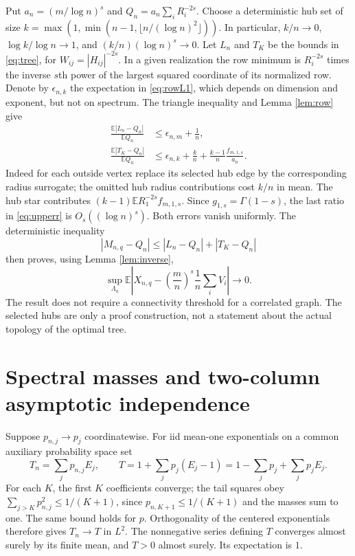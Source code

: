 \documentclass[11pt]{article}
\newcommand{\E}{\mathbb E}
\begin{document}
Put $a_n=(m/\log n)^s$ and $Q_n=a_n\sum_iR_i^{-2s}$. Choose a deterministic hub set of size $k=\max(1,\min(n-1,\lfloor n/(\log n)^2\rfloor))$. In particular, $k/n\to0$, $\log k/\log n\to1$, and $(k/n)(\log n)^s\to0$. Let $L_n$ and $T_K$ be the bounds in \eqref{eq:tree}, for $W_{ij}=|H_{ij}|^{-2s}$. In a given realization the row minimum is $R_i^{-2s}$ times the inverse $s$th power of the largest squared coordinate of its normalized row. Denote by $\epsilon_{n,k}$ the expectation in \eqref{eq:rowL1}, which depends on dimension and exponent, but not on spectrum. The triangle inequality and Lemma \ref{lem:row} give
\begin{align}
\frac{\E|L_n-Q_n|}{\E Q_n}&\le \epsilon_{n,m}+\frac1n,\label{eq:lowerr}\\
\frac{\E|T_K-Q_n|}{\E Q_n}&\le\epsilon_{n,k}+\frac{k}{n}+\frac{k-1}{n}\frac{f_{m,1,s}}{a_n}.\label{eq:upperr}
\end{align}
Indeed for each outside vertex replace its selected hub edge by the corresponding radius surrogate; the omitted hub radius contributions cost $k/n$ in mean. The hub star contributes $(k-1)\E R_1^{-2s} f_{m,1,s}$. Since $g_{1,s}=\Gamma(1-s)$, the last ratio in \eqref{eq:upperr} is $O_s((\log n)^s)$. Both errors vanish uniformly. The deterministic inequality
\[
|M_{n,q}-Q_n|\le |L_n-Q_n|+|T_K-Q_n|
\]
then proves, using Lemma \ref{lem:inverse},
\begin{equation}
\sup_{\Lambda_n}\E\left|X_{n,q}-\left(\frac{m}{n}\right)^s\frac1n\sum_i V_i\right|\to0.
\label{eq:surrogate}
\end{equation}
The result does not require a connectivity threshold for a correlated graph. The selected hubs are only a proof construction, not a statement about the actual topology of the optimal tree.

\section{Spectral masses and two-column asymptotic independence}
Suppose $p_{n,j}\to p_j$ coordinatewise. For iid mean-one exponentials on a common auxiliary probability space set
\[
 T_n=\sum_jp_{n,j}E_j,\qquad T=1+\sum_jp_j(E_j-1)=1-\sum_jp_j+\sum_jp_jE_j.
\]
For each $K$, the first $K$ coefficients converge; the tail squares obey $\sum_{j>K}p_{n,j}^2\le1/(K+1)$, since $p_{n,K+1}\le1/(K+1)$ and the masses sum to one. The same bound holds for $p$. Orthogonality of the centered exponentials therefore gives $T_n\to T$ in $L^2$. The nonnegative series defining $T$ converges almost surely by its finite mean, and $T>0$ almost surely. Its expectation is $1$.
\end{document}
